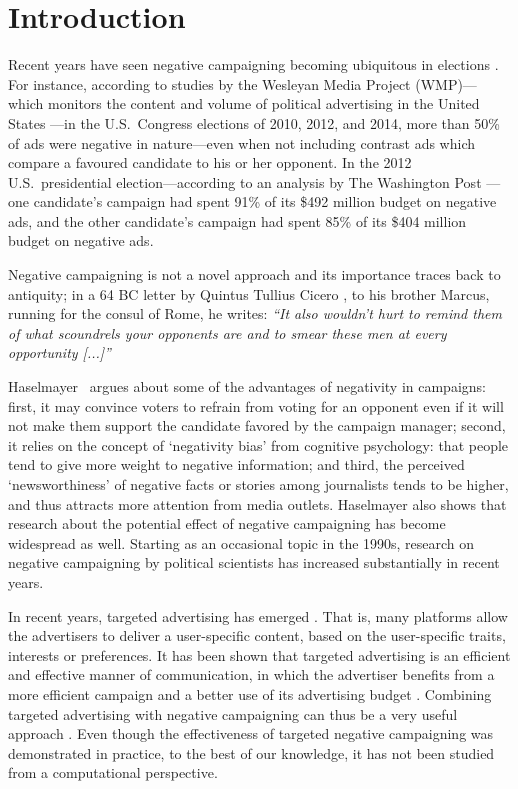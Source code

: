 \documentclass[letterpaper]{article} %
\begin{document}
\section{Introduction}
Recent years have seen negative campaigning becoming ubiquitous in elections \cite{mattes2014positive}. For instance, according to studies by the Wesleyan Media Project (WMP)---which monitors the content and volume of political advertising in the United States \cite{fowler2014political}---in the U.S.\ Congress elections of 2010, 2012, and 2014, more than 50\% of ads were negative in nature---even when not including contrast ads which compare a favoured candidate to his or her opponent. In the 2012 U.S.\ presidential election---according to an analysis by The Washington Post \cite{andrews2012}---
one candidate's campaign had spent 91\% of its \$492 million budget on negative ads, and the other candidate's campaign had spent 85\% of its \$404 million budget on negative ads.

Negative campaigning is not a novel approach and its importance  traces back to antiquity; in a 64 BC letter by Quintus Tullius Cicero \cite{cicero2012win}, to his brother Marcus, running for the consul of Rome,  he writes: \emph{``It also wouldn't hurt to remind them of what scoundrels your opponents are and to smear these men at every opportunity [...]''}

Haselmayer~ argues about some of the advantages of negativity in campaigns: first, it may convince voters to refrain from voting for an opponent even if it will not make them support the candidate favored by the campaign manager; second, it relies on the concept of `negativity bias' from cognitive psychology: that people tend to give more weight to negative information; and third, the perceived `newsworthiness' of negative facts or stories among journalists
tends to be higher, and thus attracts more attention from media outlets.
Haselmayer also shows that research about the potential effect of negative campaigning has become widespread as well. Starting as an occasional topic in the 1990s, research on negative campaigning by political scientists has increased substantially in recent years.

In recent years, targeted advertising has emerged \cite{johnson2013targeted}. That is, many platforms allow the advertisers to deliver a user-specific content, based on the user-specific traits, interests or preferences. It has been shown that targeted advertising is an efficient and effective manner of communication, in which the advertiser benefits from a more efficient campaign and a better use of its advertising budget \cite{iyer2005targeting}. Combining targeted advertising with negative campaigning can thus be a very useful approach \cite{guardian-trump-facebook-ad}. Even though the effectiveness of targeted negative campaigning was demonstrated in practice, to the best of our knowledge, it has not been studied from a computational perspective.
\end{document}
